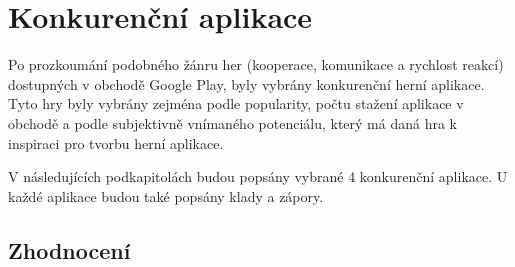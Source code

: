 \chapter{Konkurenční aplikace}
\label{chap:competitive-apps}

Po prozkoumání podobného žánru her
(kooperace, komunikace a rychlost reakcí)
dostupných v obchodě Google Play,
byly vybrány konkurenční herní aplikace.
Tyto hry byly vybrány zejména podle popularity,
počtu stažení aplikace v obchodě
a podle subjektivně vnímaného potenciálu,
který má daná hra k inspiraci pro tvorbu herní aplikace.

V následujících podkapitolách budou popsány vybrané 4 konkurenční aplikace.
U každé aplikace budou také popsány klady a zápory.






\section{Zhodnocení}

